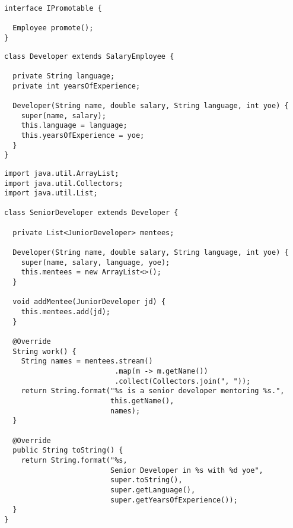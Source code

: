 \begin{lstlisting}[language=MyJava]
interface IPromotable {

  Employee promote();
}
\end{lstlisting}

\enlargethispage{-2\baselineskip}
\begin{lstlisting}[language=MyJava]
class Developer extends SalaryEmployee {

  private String language;
  private int yearsOfExperience;

  Developer(String name, double salary, String language, int yoe) {
    super(name, salary);
    this.language = language;
    this.yearsOfExperience = yoe;
  }
}
\end{lstlisting}

\begin{lstlisting}[language=MyJava]
import java.util.ArrayList;
import java.util.Collectors;
import java.util.List;

class SeniorDeveloper extends Developer {

  private List<JuniorDeveloper> mentees;

  Developer(String name, double salary, String language, int yoe) {
    super(name, salary, language, yoe);
    this.mentees = new ArrayList<>();
  }

  void addMentee(JuniorDeveloper jd) {
    this.mentees.add(jd);
  }

  @Override
  String work() {
    String names = mentees.stream()
                          .map(m -> m.getName())
                          .collect(Collectors.join(", "));
    return String.format("%s is a senior developer mentoring %s.", 
                         this.getName(), 
                         names);
  }

  @Override
  public String toString() {
    return String.format("%s, 
                         Senior Developer in %s with %d yoe", 
                         super.toString(), 
                         super.getLanguage(),
                         super.getYearsOfExperience());
  }
}
\end{lstlisting}

